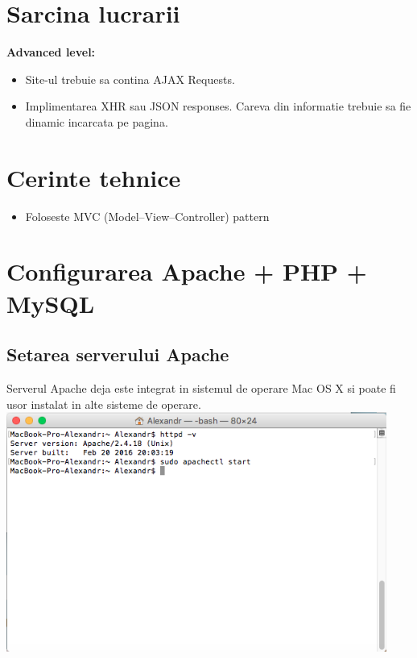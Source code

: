 \documentclass[12pt]{article}
\begin{document}
\section* {Sarcina lucrarii}
\textbf{Advanced level:}
\begin{itemize}
\item Site-ul trebuie sa contina AJAX Requests.
\item Implimentarea XHR sau JSON responses. Careva din informatie trebuie sa fie dinamic incarcata pe pagina.
\end{itemize}
\section* {Cerinte tehnice}
\begin{itemize}
\item Foloseste MVC (Model–View–Controller) pattern
\end{itemize}
\section {Configurarea Apache + PHP + MySQL}
\subsection{Setarea serverului Apache}
Serverul Apache deja este integrat in sistemul de operare Mac OS X si poate fi usor instalat in alte sisteme de operare.
\newpage 
\includegraphics[width=12.5cm]{images/1}
\end{document}
